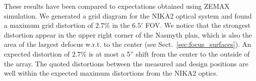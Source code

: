 These results have been compared to expectations obtained using ZEMAX
simulation. 
%
%
%
%
We generated a grid diagram for the NIKA2 optical system and found a maximum
grid distortion of $2.7\%$ in the $6.5'$ FOV. We notice that the
strongest distortion appear in the upper right corner of the Nasmyth plan, which is
also the area of the largest defocus w.r.t. to the center (see
Sect.~\ref{sec:focus_surfaces}).
An expected distortion of $2.7\%$ is at most a 5'' shift from the
center to the outside of the array. The quoted distortions between the
measured and design positions are well within the expected
maximum distortions from the NIKA2 optics.



